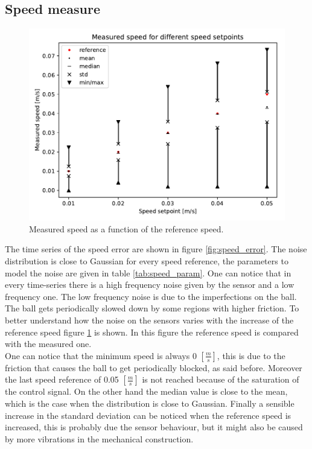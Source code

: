 \documentclass[12pt,a4paper, twoside]{article}
\begin{document}
\subsection{Speed measure} \label{sec:spee_mes}
\begin{figure}
	\centering
	\includegraphics[width=\linewidth]{fig/steady_state}
	\caption{Measured speed as a function of the reference speed.}\label{fig:steady_state}
\end{figure}
The time series of the speed error are shown in figure \ref{fig:speed_error}.
The noise distribution is close to Gaussian for every speed reference, the parameters to model the noise are given in table \ref{tab:speed_param}. One can notice that in every time-series there is a high frequency noise given by the sensor and a low frequency one. The low frequency noise is due to the imperfections on the ball. The ball gets periodically slowed down by some regions with higher friction.
To better understand how the noise on the sensors varies with the increase of the reference speed figure \ref{fig:steady_state} is shown.
In this figure the reference speed is compared with the measured one.\\

One can notice that the minimum speed is always 0 $[\frac{m}{s}]$, this is due to the friction that causes the ball to get periodically blocked, as said before. Moreover the last speed reference of 0.05 $[\frac{m}{s}]$ is not reached because of the saturation of the control signal. On the other hand the median value is close to the mean, which is the case when the distribution is close to Gaussian. Finally a sensible increase in the standard deviation can be noticed when the reference speed is increased, this is probably due the sensor behaviour, but it might also be caused by more vibrations in the mechanical construction. \\
\end{document}
